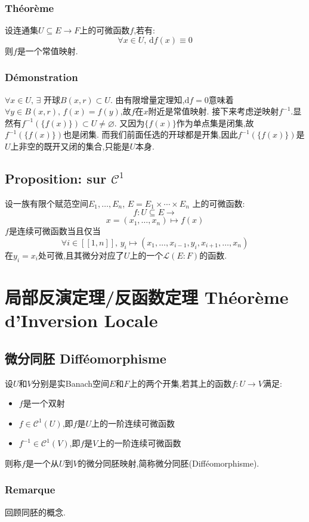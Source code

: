 \documentclass[12pt, a4paper, oneside]{ctexbook}
\newcommand{\di }{\text{d}}%
\newcommand{\fuyi }{^{-1}}%
\newcommand{\C }{\mathcal{C}}%
\begin{document}
    \subsubsection{Théorème}
    设连通集$U\subseteq E\rightarrow F$上的可微函数$f$,若有:
    $$
      \forall x\in U,\,\di f(x)\equiv 0
    $$
    则$f$是一个常值映射.
    \subsubsection{Démonstration}
    $\forall x\in U,\,\exists \text{ 开球}B(x,r)\subset U$.
    由有限增量定理知,$\di f=0$意味着$\forall y\in B(x,r),\,f(x)=f(y)$,故$f$在$x$附近是常值映射.
    接下来考虑逆映射$f\fuyi$.显然有$f\fuyi(\{f(x)\})\subset U\neq\varnothing$.
    又因为$\{f(x)\}$作为单点集是闭集,故$f\fuyi(\{f(x)\})$也是闭集.
    而我们前面任选的开球都是开集,因此$f\fuyi(\{f(x)\})$是$U$上非空的既开又闭的集合,只能是$U$本身.

 \subsection{Proposition: sur $\C^1$ }
  设一族有限个赋范空间$E_1,\dots,E_n$, $E=E_1\times \cdots \times E_n$
  上的可微函数:
  $$
    f:U\subseteq E \rightarrow
  $$
  $$
    x=(x_1,\dots,x_n)\mapsto f(x)
  $$
  $f$是连续可微函数当且仅当
  $$
  \forall i\in[\![1,n]\!],\,y_i\mapsto (x_1,\dots,x_{i-1},y_i,x_{i+1},\dots,x_n)
  $$
  在$y_i=x_i$处可微,且其微分对应了$U$上的一个$\mathcal{L}(E:F)$的函数.
\section{局部反演定理/反函数定理 Théorème d'Inversion Locale}
\subsection{微分同胚 Difféomorphisme}
  设$U$和$V$分别是实Banach空间$E$和$F$上的两个开集,若其上的函数$f:U\rightarrow V$满足:
  \begin{itemize}
    \item $f$是一个双射
    \item $f\in\mathcal{C}^1(U)$,即$f$是$U$上的一阶连续可微函数
    \item $f^{-1}\in\C^1(V)$,即$f$是$V$上的一阶连续可微函数
  \end{itemize}
  则称$f$是一个从$U$到$V$的微分同胚映射,简称微分同胚(Difféomorphisme).
  \subsubsection{Remarque}
  回顾同胚的概念.
\end{document}

